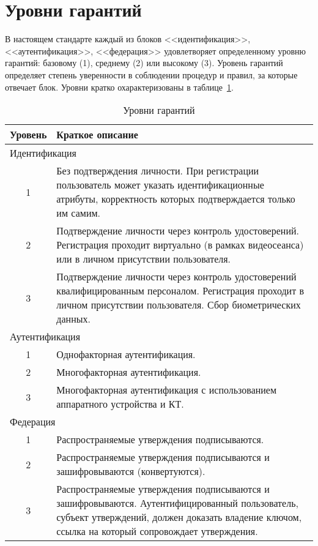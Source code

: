 \section{Уровни гарантий}\label{COMMON.Levels}

В настоящем стандарте каждый из блоков <<идентификация>>, <<аутентификация>>, 
<<федерация>> удовлетворяет определенному уровню гарантий: базовому (1), 
среднему (2) или высокому (3).
%
Уровень гарантий определяет степень уверенности в соблюдении процедур и правил, 
за которые отвечает блок.
%
Уровни кратко охарактеризованы в таблице~\ref{Table.COMMON.AL}. 

\begin{table}[hbt]
\caption{Уровни гарантий}\label{Table.COMMON.AL}
\begin{tabular}{|c|p{14cm}|}
\hline
Уровень & Краткое описание\\
\hline
\hline
\multicolumn{2}{|l|}{Идентификация}\\
\hline
\hline
%
1 & Без подтверждения личности. При регистрации пользователь может
указать идентификационные атрибуты, корректность которых подтверждается 
только им самим.\\ 
\hline
%
2 & Подтверждение личности через контроль удостоверений.
Регистрация проходит виртуально (в рамках видеосеанса) или в личном присутствии 
пользователя.\\
\hline
%
3 & Подтверждение личности через контроль удостоверений квалифицированным 
персоналом. Регистрация проходит в личном присутствии пользователя.
Сбор биометрических данных.\\
%
\hline
\hline
\multicolumn{2}{|l|}{Аутентификация}\\
\hline
\hline
%
1 & Однофакторная аутентификация.\\
\hline
%
2 & Многофакторная аутентификация.\\
\hline
%
3 & Многофакторная аутентификация с использованием аппаратного устройства 
и КТ.\\
%
\hline
\hline
\multicolumn{2}{|l|}{Федерация}\\
\hline
\hline
%
1 & Распространяемые утверждения подписываются.\\
\hline
%
2 & Распространяемые утверждения подписываются и зашифровываются 
(конвертуются).\\
\hline
%
3 & Распространяемые утверждения подписываются и зашифровываются.
Аутентифицированный пользователь, субъект утверждений, должен доказать владение 
ключом, ссылка на который сопровождает утверждения.\\ 
\hline
\end{tabular}
\end{table}

